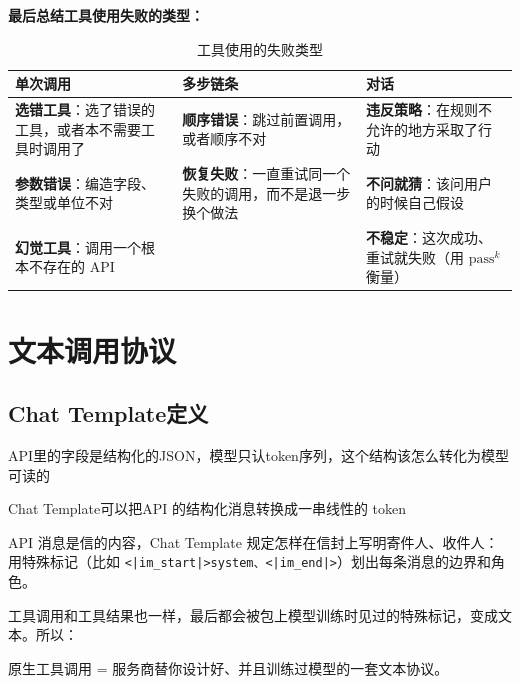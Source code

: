 \textbf{最后总结工具使用失败的类型：}
\begin{table}[H]
\centering
\caption{工具使用的失败类型}
\label{tab:tool-failures}
\begin{tabular}{p{4.9cm} p{4.9cm} p{4.9cm}}
  \toprule
  \textbf{单次调用} & \textbf{多步链条} & \textbf{对话} \\
  \midrule
  \textbf{选错工具}：选了错误的工具，或者本不需要工具时调用了 &
  \textbf{顺序错误}：跳过前置调用，或者顺序不对 &
  \textbf{违反策略}：在规则不允许的地方采取了行动 \\
  \addlinespace
  \textbf{参数错误}：编造字段、类型或单位不对 &
  \textbf{恢复失败}：一直重试同一个失败的调用，而不是退一步换个做法 &
  \textbf{不问就猜}：该问用户的时候自己假设 \\
  \addlinespace
  \textbf{幻觉工具}：调用一个根本不存在的 API &
  &
  \textbf{不稳定}：这次成功、重试就失败（用 $\text{pass}^k$ 衡量） \\
  \bottomrule
\end{tabular}
\end{table}
\section{文本调用协议}
\subsection{Chat Template定义}
API里的字段是结构化的JSON，模型只认token序列，这个结构该怎么转化为模型可读的

Chat Template可以把API 的结构化消息转换成一串线性的 token
\begin{tcolorbox}[enhanced, sharp corners, boxrule=0pt, frame hidden,
                  borderline west={3pt}{0pt}{structurecolor},
                  colback=structurecolor!5]
API 消息是信的内容，Chat Template 规定怎样在信封上写明寄件人、收件人：用特殊标记（比如 \texttt{<|im\_start|>system、<|im\_end|>}）划出每条消息的边界和角色。
\end{tcolorbox}
工具调用和工具结果也一样，最后都会被包上模型训练时见过的特殊标记，变成文本。所以：
\begin{tcolorbox}[enhanced, sharp corners, boxrule=0pt, frame hidden,
                  borderline west={3pt}{0pt}{structurecolor},
                  colback=structurecolor!5]
原生工具调用 = 服务商替你设计好、并且训练过模型的一套文本协议。
\end{tcolorbox}
